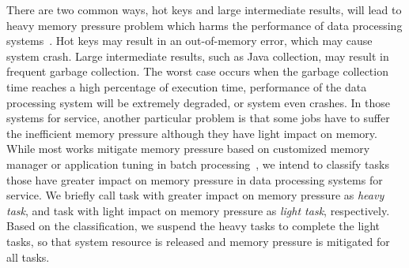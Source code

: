 There are two common ways, hot keys and large intermediate results, will lead to heavy memory pressure problem which harms the performance of data processing systems~\cite{fang2015interruptible}. Hot keys may result in an out-of-memory error, which may cause system crash. Large intermediate results, such as Java collection, may result in frequent garbage collection. The worst case occurs when the garbage collection time reaches a high percentage of execution time, performance of the data processing system will be extremely degraded, or system even crashes. In those systems for service, another particular problem is that some jobs have to suffer the inefficient memory pressure although they have light impact on memory. While most works mitigate memory pressure based on customized memory manager or application tuning in batch processing~\cite{www:spark-tuning, nguyen2015facade, fang2015interruptible, lulu:deca, nguyen:yak}, we intend to classify tasks those have greater impact on memory pressure in data processing systems for service. We briefly call task with greater impact on memory pressure as \textit{heavy task}, and task with light impact on memory pressure as \textit{light task}, respectively. Based on the classification, we suspend the heavy tasks to complete the light tasks, so that system resource is released and memory pressure is mitigated for all tasks.


